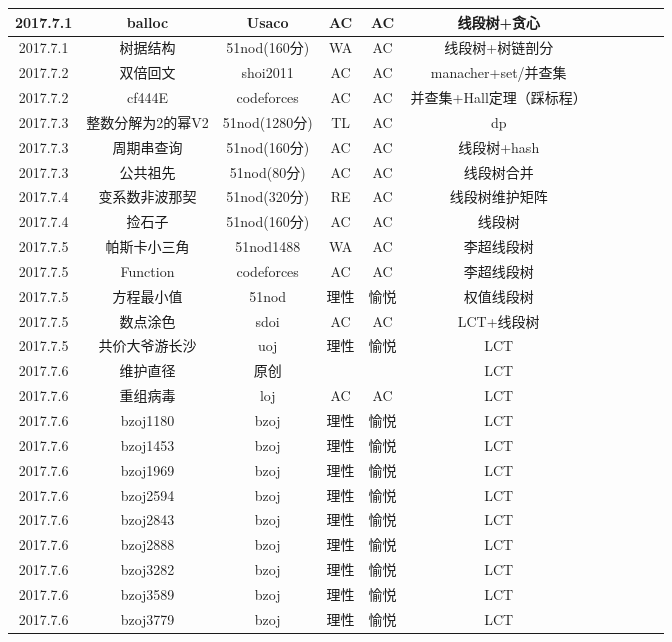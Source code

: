 \documentclass[landscape]{article}
\begin{document}
\begin{longtable}{ccccccccccc}
  \hline
  2017.7.1 & balloc & Usaco & AC & AC & 线段树+贪心\\
  \hline
  2017.7.1 & 树据结构 & 51nod(160分) & WA & AC & 线段树+树链剖分\\
  \hline
  2017.7.2 & 双倍回文 & shoi2011 & AC & AC & manacher+set/并查集\\
  \hline
  2017.7.2 & cf444E & codeforces & AC & AC & 并查集+Hall定理（踩标程）\\
  \hline
  2017.7.3 & 整数分解为2的幂V2 & 51nod(1280分) & TL & AC & dp\\
  \hline
  2017.7.3 & 周期串查询 & 51nod(160分) & AC & AC & 线段树+hash\\
  \hline
  2017.7.3 & 公共祖先 & 51nod(80分) & AC & AC & 线段树合并\\
  \hline
  2017.7.4 & 变系数非波那契 & 51nod(320分) & RE & AC & 线段树维护矩阵\\
  \hline
  2017.7.4 & 捡石子 & 51nod(160分) & AC & AC & 线段树\\
  \hline
  2017.7.5 & 帕斯卡小三角 & 51nod1488 & WA & AC & 李超线段树\\
  \hline
  2017.7.5 & Function & codeforces & AC & AC & 李超线段树\\
  \hline
  2017.7.5 & 方程最小值 & 51nod & 理性 & 愉悦 & 权值线段树\\
  \hline
  2017.7.5 & 数点涂色 & sdoi & AC & AC & LCT+线段树\\
  \hline
  2017.7.5 & 共价大爷游长沙 & uoj & 理性 & 愉悦 & LCT\\
  \hline
  2017.7.6 & 维护直径 & 原创 & & & LCT\\
  \hline
  2017.7.6 & 重组病毒 & loj & AC & AC & LCT\\
  \hline
  2017.7.6 & bzoj1180 & bzoj & 理性 & 愉悦 & LCT\\
  \hline
  2017.7.6 & bzoj1453 & bzoj & 理性 & 愉悦 & LCT\\
  \hline
  2017.7.6 & bzoj1969 & bzoj & 理性 & 愉悦 & LCT\\
  \hline
  2017.7.6 & bzoj2594 & bzoj & 理性 & 愉悦 & LCT\\
  \hline
  2017.7.6 & bzoj2843 & bzoj & 理性 & 愉悦 & LCT\\
  \hline
  2017.7.6 & bzoj2888 & bzoj & 理性 & 愉悦 & LCT\\
  \hline
  2017.7.6 & bzoj3282 & bzoj & 理性 & 愉悦 & LCT\\
  \hline
  2017.7.6 & bzoj3589 & bzoj & 理性 & 愉悦 & LCT\\
  \hline
  2017.7.6 & bzoj3779 & bzoj & 理性 & 愉悦 & LCT\\
  \hline
\end{longtable}
\end{document}

